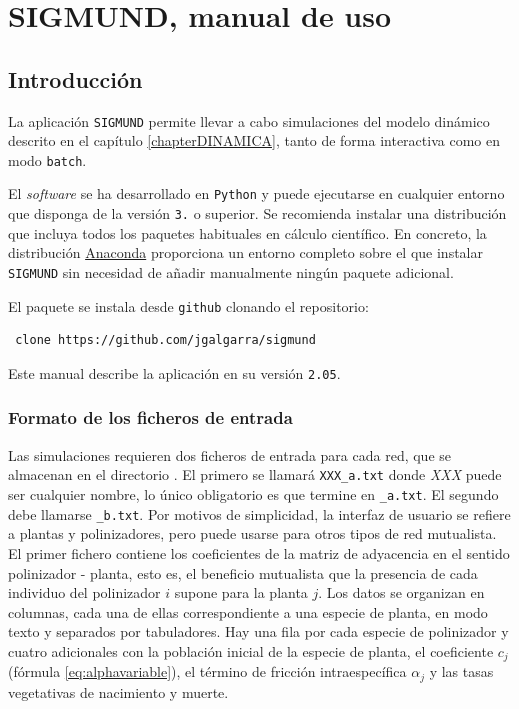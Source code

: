 
\appendix
\renewcommand{\thechapter}{A}
\chapter{SIGMUND, manual de uso} %

\label{APP_SIGMUNDMAN} %

\section*{Introducción}

La aplicación \texttt{SIGMUND} permite llevar a cabo simulaciones del modelo dinámico descrito en el capítulo \ref{chapterDINAMICA}, tanto de forma interactiva como en modo \texttt{batch}.

El \textit{software} se ha desarrollado en \texttt{Python} y puede ejecutarse en cualquier entorno que disponga de la versión \texttt{3.} o superior. Se recomienda instalar una distribución que incluya todos los paquetes habituales en cálculo científico. En concreto, la distribución \href{https://www.continuum.io/}{Anaconda} proporciona un entorno completo sobre el que instalar \texttt{SIGMUND} sin necesidad de añadir manualmente ningún paquete adicional.

El paquete se instala desde \texttt{github} clonando el repositorio:

\fontsize{3.5mm}{3.5mm}\selectfont
\begin{verbatim}
 clone https://github.com/jgalgarra/sigmund 
\end{verbatim}
\normalsize

Este manual describe la aplicación en su versión \texttt{2.05}.
 
\subsection*{Formato de los ficheros de entrada}
\label{sec:ASIGMUNDMAN_input_file_format}

Las simulaciones requieren dos ficheros de entrada para cada red, que se almacenan en el directorio . El primero se llamará \texttt{XXX\_a.txt} donde \textit{XXX} puede ser cualquier nombre, lo único obligatorio es que termine en \texttt{\_a.txt}. El segundo debe llamarse \texttt{\_b.txt}. Por motivos de simplicidad, la interfaz de usuario se refiere a plantas y polinizadores, pero puede usarse para otros tipos de red mutualista.
El primer fichero contiene los coeficientes de la matriz de adyacencia en el sentido polinizador - planta, esto es, el beneficio mutualista que la presencia de cada individuo del polinizador $i$ supone para la planta $j$. Los datos se organizan en columnas, cada una de ellas correspondiente a una especie de planta, en modo texto y separados por tabuladores. Hay una fila por cada especie de polinizador y cuatro adicionales con la población inicial de la especie de planta, el coeficiente $c_{j}$ (fórmula \ref{eq:alphavariable}), el término de fricción intraespecífica $\alpha_{j}$ y las tasas vegetativas de nacimiento y muerte.

